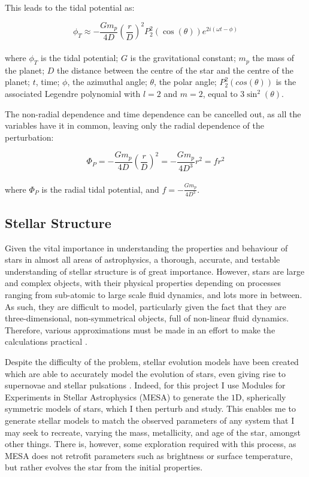 \documentclass[11pt]{amsart}
\begin{document}
This leads to the tidal potential as:

\begin{equation} \label{eq:tidal_full}
\phi_{T} \approx - \frac{G m_{p}}{4 D}  \left( \frac{r}{D} \right)^{2}  P_{2}^{2} (\cos (\theta)) e^{2 i (\omega t - \phi)} 
\end{equation}
\\
where $\phi_{T}$ is the tidal potential; $G$ is the gravitational constant; $m_{p}$ the mass of the planet; $D$ the distance between the centre of the star and the centre of the planet; $t$, time; $\phi$, the azimuthal angle; $\theta$, the polar angle; $P_{2}^{2}(cos(\theta))$ is the associated Legendre polynomial with $l=2$ and $m=2$, equal to $3 \sin^{2}(\theta)$.

The non-radial dependence and time dependence can be cancelled out, as all the variables have it in common, leaving only the radial dependence of the perturbation:

\begin{equation}
\Phi_{P} = - \frac{G m_{p}}{4 D}  \left( \frac{r}{D} \right)^{2} = - \frac{G m_{p}}{4 D^{3}} r^{2} = f r^{2}
\end{equation}
\\
where $\Phi_{P}$ is the radial tidal potential, and $f = - \frac{G m_{p}}{4 D^{3}}$.







\iffalse

\subsection{Stellar Structure} \label{Intro:StellarStruc}

Given the vital importance in understanding the properties and behaviour of stars in almost all areas of astrophysics, a thorough, accurate, and testable understanding of stellar structure is of great importance.  However, stars are large and complex objects, with their physical properties depending on processes ranging from sub-atomic to large scale fluid dynamics, and lots more in between.  As such, they are difficult to model, particularly given the fact that they are three-dimensional, non-symmetrical objects, full of non-linear fluid dynamics.  Therefore, various approximations must be made in an effort to make the calculations practical \cite{Paxton2011}.

Despite the difficulty of the problem, stellar evolution models have been created which are able to accurately model the evolution of stars, even giving rise to supernovae and stellar pulsations \cite{Paxton2015}.  Indeed, for this project I use Modules for Experiments in Stellar Astrophysics (MESA) \cite{Paxton2011} to generate the $1$D, spherically symmetric models of stars, which I then perturb and study.  This enables me to generate stellar models to match the observed parameters of any system that I may seek to recreate, varying the mass, metallicity, and age of the star, amongst other things.  There is, however, some exploration required with this process, as MESA does not retrofit parameters such as brightness or surface temperature, but rather evolves the star from the initial properties.
\end{document}
